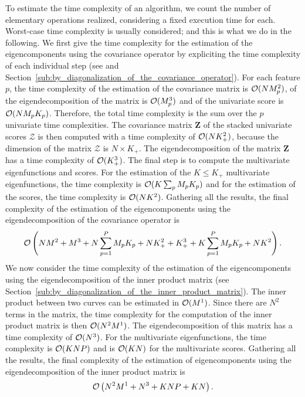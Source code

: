 To estimate the time complexity of an algorithm, we count the number of elementary operations realized, considering a fixed execution time for each. Worst-case time complexity is usually considered; and this is what we do in the following. We first give the time complexity for the estimation of the eigencomponents using the covariance operator by expliciting the time complexity of each individual step (see \cite{happMultivariateFunctionalPrincipal2018a} and Section~\ref{sub:by_diagonalization_of_the_covariance_operator}). For each feature $p$, the time complexity of the estimation of the covariance matrix is $\operatorname{\mathcal{O}}(NM_p^2)$, of the eigendecomposition of the matrix is $\operatorname{\mathcal{O}}(M_p^3)$ and of the univariate score is $\operatorname{\mathcal{O}}(NM_pK_p)$. Therefore, the total time complexity is the sum over the $p$ univariate time complexities. The covariance matrix $\mathbf{Z}$ of the stacked univariate scores $\mathcal{Z}$ is then computed with a time complexity of $\operatorname{\mathcal{O}}(NK_+^2)$, because the dimension of the matrix $\mathcal{Z}$ is $N \times K_+$. The eigendecomposition of the matrix $\mathbf{Z}$ has a time complexity of $\operatorname{\mathcal{O}}(K_+^3)$. The final step is to compute the multivariate eigenfunctions and scores. For the estimation of the $K \leq K_+$ multivariate eigenfunctions, the time complexity is $\operatorname{\mathcal{O}}(K\sum_{p} M_pK_p)$ and for the estimation of the scores, the time complexity is $\operatorname{\mathcal{O}}(NK^2)$. Gathering all the results, the final complexity of the estimation of the eigencomponents using the eigendecomposition of the covariance operator is
\begin{equation}\label{eq:time_compl_cov}
    \operatorname{\mathcal{O}}\left(NM^2 + M^3 + N\sum_{p = 1}^P M_pK_p + NK_+^2 + K_+^3 + K\sum_{p = 1}^P M_pK_p + NK^2\right).
\end{equation}
We now consider the time complexity of the estimation of the eigencomponents using the eigendecomposition of the inner product matrix (see Section~\ref{sub:by_diagonalization_of_the_inner_product_matrix}). The inner product between two curves can be estimated in $\operatorname{\mathcal{O}}(M^1)$. Since there are $N^2$ terms in the matrix, the time complexity for the computation of the inner product matrix is then $\operatorname{\mathcal{O}}(N^2M^1)$. The eigendecomposition of this matrix has a time complexity of $\operatorname{\mathcal{O}}(N^3)$. For the multivariate eigenfunctions, the time complexity is $\operatorname{\mathcal{O}}(KNP)$ and is $\operatorname{\mathcal{O}}(KN)$ for the multivariate scores. Gathering all the results, the final complexity of the estimation of eigencomponents using the eigendecomposition of the inner product matrix is
\begin{equation}\label{eq:time_compl_in_prod}
    \operatorname{\mathcal{O}}\left(N^2M^1 + N^3 + KNP + KN\right).
\end{equation}

